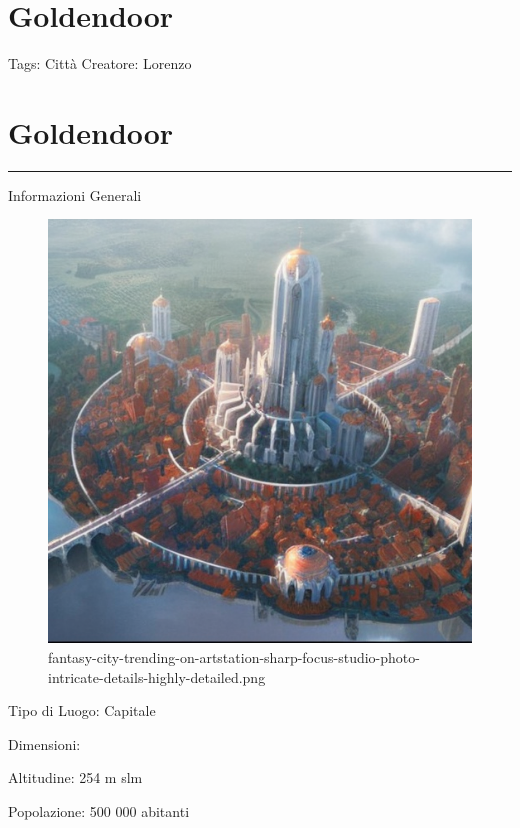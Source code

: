 \section{Goldendoor}\label{goldendoor}

Tags: Città Creatore: Lorenzo

\section{Goldendoor}\label{goldendoor-1}

\begin{center}\rule{0.5\linewidth}{0.5pt}\end{center}

Informazioni Generali

\begin{figure}
\centering
\includegraphics{fantasy-city-trending-on-artstation-sharp-focus-studio-photo-intricate-details-highly-detailed.png}
\caption{fantasy-city-trending-on-artstation-sharp-focus-studio-photo-intricate-details-highly-detailed.png}
\end{figure}

Tipo di Luogo: Capitale

Dimensioni:

Altitudine: 254 m slm

Popolazione: 500 000 abitanti

